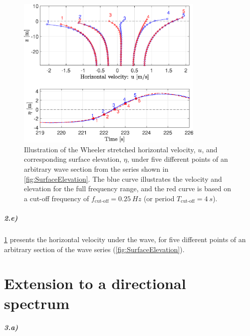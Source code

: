 \begin{figure}[htbp]
    \centering
    \includegraphics[width=0.8\textwidth]{Figures/Plots/etaHozvel.eps}
    \caption{Illustration of the Wheeler stretched horizontal velocity, $u$, and corresponding surface elevation, $\eta$, under five different points of an arbitrary wave section from the series shown in \cref{fig:SurfaceElevation}. The blue curve illustrates the velocity and elevation for the full frequency range, and the red curve is based on a cut-off frequency of $f_{\text{cut-off}}=\SI{0.25}{Hz}$ (or period $T_{\text{cut-off}}=\SI{4}{s}$). }
    \label{fig:etaHozvel}
\end{figure}

\paragraph{2.e)} \cref{fig:etaHozvel} presents the horizontal velocity under the wave, for five different points of an arbitrary section of the wave series (\cref{fig:SurfaceElevation}). 


\vspace{15mm}
{\let\clearpage\relax \chapter{Extension to a directional spectrum}}

\paragraph{3.a) } 

